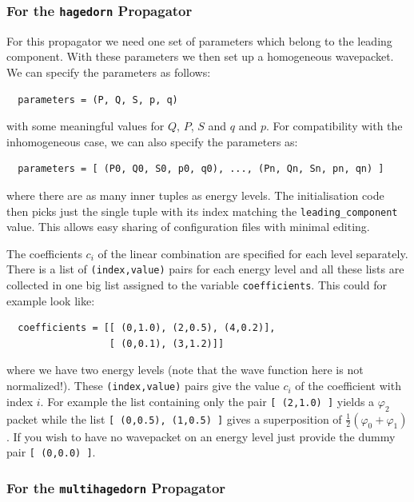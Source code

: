 \documentclass[a4paper,10pt]{report}
\begin{document}
\subsubsection{For the \texttt{hagedorn} Propagator}

For this propagator we need one set of parameters which belong to
the leading component. With these parameters we then set up a homogeneous
wavepacket. We can specify the parameters as follows:

\begin{verbatim}
  parameters = (P, Q, S, p, q)
\end{verbatim}

with some meaningful values for $Q$, $P$, $S$ and $q$ and $p$. For compatibility
with the inhomogeneous case, we can also specify the parameters as:

\begin{verbatim}
  parameters = [ (P0, Q0, S0, p0, q0), ..., (Pn, Qn, Sn, pn, qn) ]
\end{verbatim}

where there are as many inner tuples as energy levels. The initialisation
code then picks just the single tuple with its index matching the
\texttt{leading\_component} value. This allows easy sharing of
configuration files with minimal editing.

The coefficients $c_i$ of the linear combination are specified for each
level separately. There is a list of \texttt{(index,value)} pairs for
each energy level and all these lists are collected in one big list
assigned to the variable \texttt{coefficients}. This could for example look like:

\begin{verbatim}
  coefficients = [[ (0,1.0), (2,0.5), (4,0.2)],
                  [ (0,0.1), (3,1.2)]]
\end{verbatim}

where we have two energy levels (note that the wave function here is not normalized!).
These \texttt{(index,value)} pairs give the value $c_i$ of the coefficient
with index $i$. For example the list containing only the pair \texttt{[ (2,1.0) ]}
yields a $\varphi_2$ packet while the list \texttt{[ (0,0.5), (1,0.5) ]} gives
a superposition of $\frac{1}{2} \left( \varphi_0 + \varphi_1 \right)$. If you
wish to have no wavepacket on an energy level just provide the dummy pair \texttt{[ (0,0.0) ]}.

\subsubsection{For the \texttt{multihagedorn} Propagator}
\end{document}
